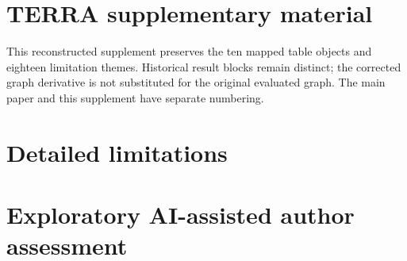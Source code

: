 \documentclass[10pt]{article}
\begin{document}
\section*{TERRA supplementary material}
This reconstructed supplement preserves the ten mapped table objects and eighteen limitation themes. Historical result blocks remain distinct; the corrected graph derivative is not substituted for the original evaluated graph. The main paper and this supplement have separate numbering.
\clearpage
\begingroup\small

\endgroup
\clearpage
\begingroup\small

\endgroup
\clearpage
\begingroup\small

\endgroup
\clearpage
\begingroup\small

\endgroup
\clearpage
\begingroup\small

\endgroup
\clearpage
\begingroup\small

\endgroup
\clearpage
\begingroup\small

\endgroup
\clearpage
\begingroup\small

\endgroup
\clearpage
\begingroup\small

\endgroup
\clearpage
\begingroup\small

\endgroup
\clearpage\section{Detailed limitations}\begin{enumerate}\end{enumerate}
\section{Exploratory AI-assisted author assessment}

\end{document}
